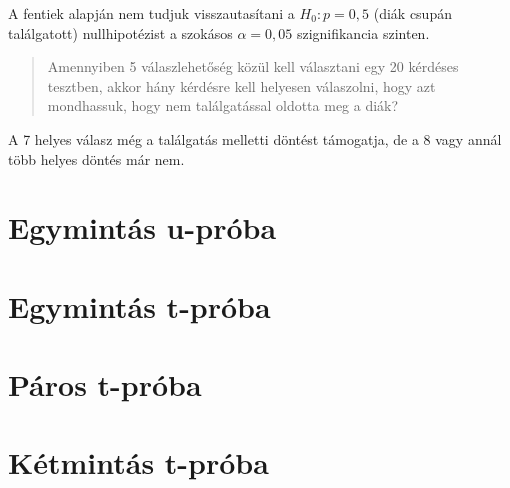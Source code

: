 \documentclass[
]{book}
\newenvironment{Shaded}{\begin{snugshade}}{\end{snugshade}}
\newcommand{\AttributeTok}[1]{\textcolor[rgb]{0.77,0.63,0.00}{#1}}
\newcommand{\CommentTok}[1]{\textcolor[rgb]{0.56,0.35,0.01}{\textit{#1}}}
\newcommand{\DecValTok}[1]{\textcolor[rgb]{0.00,0.00,0.81}{#1}}
\newcommand{\FunctionTok}[1]{\textcolor[rgb]{0.00,0.00,0.00}{#1}}
\newcommand{\NormalTok}[1]{#1}
\newcommand{\SpecialCharTok}[1]{\textcolor[rgb]{0.00,0.00,0.00}{#1}}
\begin{document}
A fentiek alapján nem tudjuk visszautasítani a \(H_0: p=0,5\) (diák csupán találgatott) nullhipotézist a szokásos \(\alpha=0,05\) szignifikancia szinten.

\begin{quote}
Amennyiben 5 válaszlehetőség közül kell választani egy 20 kérdéses tesztben, akkor hány kérdésre kell helyesen válaszolni, hogy azt mondhassuk, hogy nem találgatással oldotta meg a diák?
\end{quote}

\begin{Shaded}
\end{Shaded}

A 7 helyes válasz még a találgatás melletti döntést támogatja, de a 8 vagy annál több helyes döntés már nem.

\hypertarget{egymintuxe1s-u-pruxf3ba-1}{%
\section{Egymintás u-próba}\label{egymintuxe1s-u-pruxf3ba-1}}

\hypertarget{egymintuxe1s-t-pruxf3ba}{%
\section{Egymintás t-próba}\label{egymintuxe1s-t-pruxf3ba}}

\hypertarget{puxe1ros-t-pruxf3ba}{%
\section{Páros t-próba}\label{puxe1ros-t-pruxf3ba}}

\hypertarget{kuxe9tmintuxe1s-t-pruxf3ba}{%
\section{Kétmintás t-próba}\label{kuxe9tmintuxe1s-t-pruxf3ba}}
\end{document}

